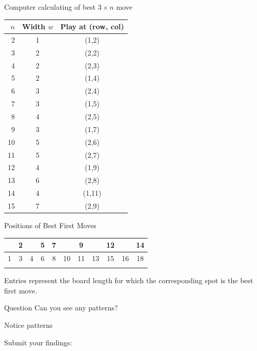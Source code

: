 \documentclass{beamer}
\begin{document}
\begin{frame}{Computer calculating of best $3\times n$ move}
\begin{center}
\begin{tabular}{r|c|c}
\hline
$n$ & Width $w$ & Play at (row, col) \\
\hline


2  & 1  & (1,2)  \\
3  & 2  & (2,2)  \\
4  & 2  & (2,3)  \\
5  & 2  & (1,4)  \\
6  & 3  & (2,4)  \\
7  & 3  & (1,5)  \\
8  & 4  & (2,5)  \\
9  & 3  & (1,7)  \\
10 & 5  & (2,6)  \\
11 & 5  & (2,7)  \\
12 & 4  & (1,9)  \\
13 & 6  & (2,8)  \\
14 & 4  & (1,11) \\
15 & 7  & (2,9)  \\
\end{tabular}
\end{center}
\end{frame}

\begin{frame}{Positions of Best First Moves}
\begin{center}
\begin{tabular}{|c|c|c|c|c|c|c|c|c|c|c|}
\hline
    & 2 &   & 5 & 7 &   & 9 &   &12 &   &14 \\\hline
  1 & 3 & 4 & 6 & 8 &10 &11 &13 &15 &16 &18 \\\hline
    &   &   &   &   &   &   &   &   &   &   \\\hline
\end{tabular}
\end{center}
Entries represent the board length for which the corresponding spot is the best first move.
\begin{block}{Question}
Can you see any patterns?
\end{block}
\end{frame}

\begin{frame}{Notice patterns}
  \begin{block}{Submit your findings:}
    \begin{center}
    \end{center}
  \end{block}
\end{frame}
\end{document}
